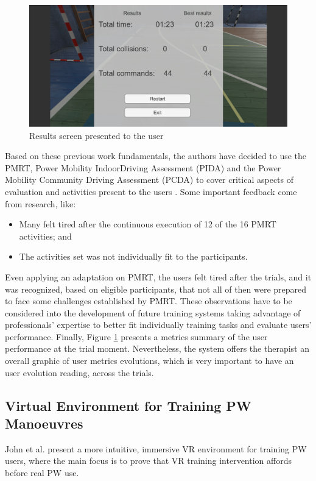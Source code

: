 \begin{figure}[!hbt]
\begin{center}
\includegraphics[width=1 \textwidth]{img/cap3/martins2017}
\caption{Results screen presented to the user \cite{martins2017}}
\label{fig:martins2017}
\end{center}
\end{figure}

Based on these previous work fundamentals, the authors have decided to use the PMRT, Power Mobility
IndoorDriving Assessment (PIDA) and the Power Mobility Community Driving Assessment (PCDA) to cover critical aspects of evaluation and activities present to the users \cite{dawson1994}. Some important feedback come from  \cite{valentini2019} research, like: 

\begin{itemize}
\item Many felt tired after the continuous execution of 12 of the 16 PMRT activities; and
\item The activities set was not individually fit to the participants.
\end{itemize}

Even applying an adaptation on PMRT, the users felt tired after the trials, and it was recognized, based on eligible participants, that not all of then were prepared to face some challenges established by PMRT. These observations have to be considered into the development of future training systems taking advantage of professionals' expertise to better fit individually training tasks and evaluate users' performance. Finally, Figure \ref{fig:martins2017} presents a metrics summary of the user performance at the trial moment. Nevertheless, the system offers the therapist an overall graphic of user metrics evolutions, which is very important to have an user evolution reading, across the trials.


\subsection{Virtual Environment for Training PW Manoeuvres}
John et al. \cite{john2018} present a more intuitive, immersive VR environment for training PW users, where the main focus is to prove that VR training intervention affords before real PW use.

